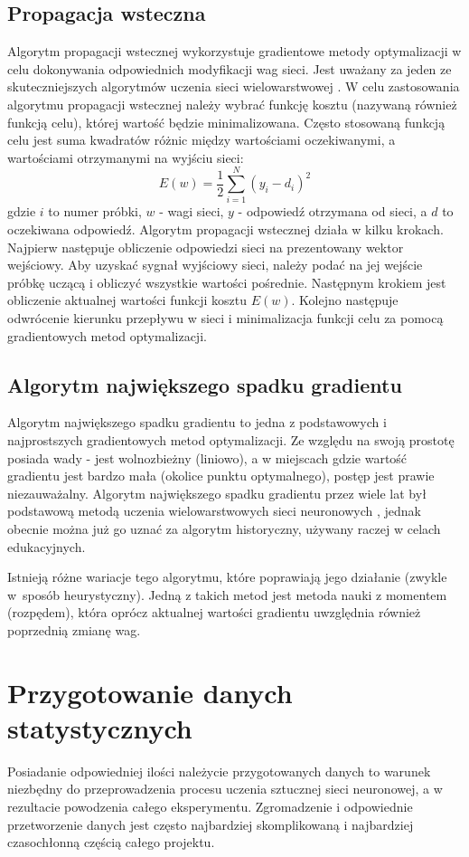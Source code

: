 \section{Propagacja wsteczna}
\label{Sec:ThBackprop}
Algorytm propagacji wstecznej wykorzystuje gradientowe metody optymalizacji w celu dokonywania odpowiednich modyfikacji wag sieci. Jest uważany za jeden ze skuteczniejszych algorytmów uczenia sieci wielowarstwowej \cite{osow01}. W celu zastosowania algorytmu propagacji wstecznej należy wybrać funkcję kosztu (nazywaną również funkcją celu), której wartość będzie minimalizowana. Często stosowaną funkcją celu jest suma kwadratów różnic między wartościami oczekiwanymi, a wartościami otrzymanymi na wyjściu sieci: $$ E(w)=\frac{1}{2}\sum_{i=1}^{N}(y_i-d_i)^2$$ gdzie $i$ to numer próbki, $w$ - wagi sieci, $y$ - odpowiedź otrzymana od sieci, a $d$ to oczekiwana odpowiedź. Algorytm propagacji wstecznej działa w kilku krokach. Najpierw następuje obliczenie odpowiedzi sieci na prezentowany wektor wejściowy. Aby uzyskać sygnał wyjściowy sieci, należy podać na jej wejście próbkę uczącą i obliczyć wszystkie wartości pośrednie. Następnym krokiem jest obliczenie aktualnej wartości funkcji kosztu $E(w)$. Kolejno następuje odwrócenie kierunku przepływu w sieci i minimalizacja funkcji celu za pomocą gradientowych metod optymalizacji.


\section{Algorytm największego spadku gradientu}
\label{Sec:ThGrad}
Algorytm największego spadku gradientu to jedna z podstawowych i najprostszych gradientowych metod optymalizacji. Ze względu na swoją prostotę posiada wady - jest wolnozbieżny (liniowo), a w miejscach gdzie wartość gradientu jest bardzo mała (okolice punktu optymalnego), postęp jest prawie niezauważalny. Algorytm największego spadku gradientu przez wiele lat był podstawową metodą uczenia wielowarstwowych sieci neuronowych \cite{osow01}, jednak obecnie można już go uznać za algorytm historyczny, używany raczej w celach edukacyjnych.

Istnieją różne wariacje tego algorytmu, które poprawiają jego działanie (zwykle w~sposób heurystyczny). Jedną z takich metod jest metoda nauki z momentem (rozpędem), która oprócz aktualnej wartości gradientu uwzględnia również poprzednią zmianę wag.

\chapter{Przygotowanie danych statystycznych}
Posiadanie odpowiedniej ilości należycie przygotowanych danych to warunek niezbędny do przeprowadzenia procesu uczenia sztucznej sieci neuronowej, a w rezultacie powodzenia całego eksperymentu. Zgromadzenie i odpowiednie przetworzenie danych jest często najbardziej skomplikowaną i najbardziej czasochłonną częścią całego projektu. 

